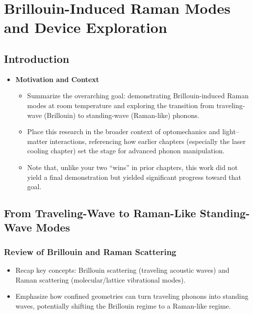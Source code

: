 \setcounter{rownumber}{0}
\singlespacing
\chapter{Brillouin-Induced Raman Modes and Device Exploration}
\label{ch:Raman}
\acresetall

\doublespacing


\section{Introduction}
\label{sec:Raman:Introduction}

\begin{itemize}
  \item \textbf{Motivation and Context}
  \begin{itemize}
    \item Summarize the overarching goal: demonstrating Brillouin-induced Raman modes at room temperature and exploring the transition from traveling-wave (Brillouin) to standing-wave (Raman-like) phonons.
    \item Place this research in the broader context of optomechanics and light--matter interactions, referencing how earlier chapters (especially the laser cooling chapter) set the stage for advanced phonon manipulation.
    \item Note that, unlike your two ``wins'' in prior chapters, this work did not yield a final demonstration but yielded significant progress toward that goal.
  \end{itemize}
\end{itemize}


\section{From Traveling-Wave to Raman-Like Standing-Wave Modes}
\label{sec:Raman:FromTraveling-WavetoRaman-LikeStanding-WaveModes}

\subsection{Review of Brillouin and Raman Scattering}
\label{subsec:Raman:ReviewofBrillouinandRamanScattering}

\begin{itemize}
  \item Recap key concepts: Brillouin scattering (traveling acoustic waves) and Raman scattering (molecular/lattice vibrational modes).
  \item Emphasize how confined geometries can turn traveling phonons into standing waves, potentially shifting the Brillouin regime to a Raman-like regime.
\end{itemize}

